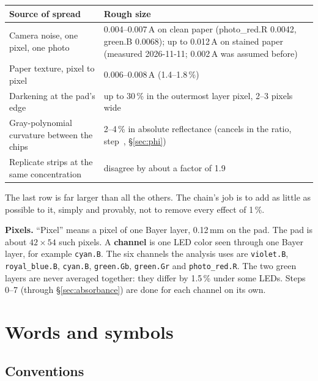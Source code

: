 \documentclass[11pt,letter]{article}
\makeatletter
\newcommand{\sno}[1]{step~\@nameuse{stepno@#1}}
\newcommand{\psref}[1]{\sno{#1}, \S\ref{#1}}  %
\makeatother
\begin{document}
\medskip
\begin{tabular}{@{}L{7.5cm}L{7.0cm}@{}}
\toprule
Source of spread & Rough size \\
\midrule
Camera noise, one pixel, one photo & 0.004--0.007\,A on clean paper
  (photo\_red.R 0.0042, green.B 0.0068); up to 0.012\,A on stained paper
  (measured 2026-11-11; 0.002\,A was assumed before) \\
Paper texture, pixel to pixel & 0.006--0.008\,A (1.4--1.8\,\%) \\
Darkening at the pad's edge & up to 30\,\% in the outermost layer
  pixel, 2--3 pixels wide \\
Gray-polynomial curvature between the chips & 2--4\,\% in absolute
  reflectance (cancels in the ratio, \psref{sec:phi}) \\
Replicate strips at the same concentration & disagree by about a factor of
  1.9 \\
\bottomrule
\end{tabular}

\medskip
\noindent The last row is far larger than all the others.  The chain's job
is to add as little as possible to it, simply and provably, not to remove
every effect of 1\,\%.

\textbf{Pixels.}  ``Pixel'' means a pixel of one Bayer layer, 0.12\,mm on
the pad.  The pad is about $42 \times 54$ such pixels.  A
\textbf{channel} is one LED color seen through one Bayer layer, for example
\texttt{cyan.B}.  The six channels the analysis uses are \texttt{violet.B},
\texttt{royal\_blue.B}, \texttt{cyan.B}, \texttt{green.Gb}, \texttt{green.Gr}
and \texttt{photo\_red.R}.  The two green layers are never averaged
together: they differ by 1.5\,\% under some LEDs.  Steps 0--7
(through \S\ref{sec:absorbance}) are done for each channel on its own.

\section{Words and symbols}
\label{sec:symbols}

\subsection{Conventions}
\end{document}
